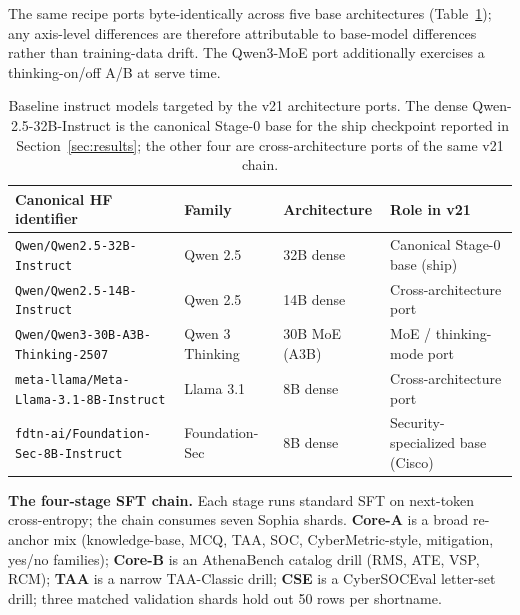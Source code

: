 \documentclass[conference]{IEEEtran}
\providecommand{\hfid}[1]{{\small\nolinkurl{#1}}}
\begin{document}
The same recipe ports byte-identically across five base architectures (Table~\ref{tab:base-models}); any axis-level differences are therefore attributable to base-model differences rather than training-data drift. The Qwen3-MoE port additionally exercises a thinking-on/off A/B at serve time.

\begin{table}[t]
\centering
\caption{Baseline instruct models targeted by the v21 architecture ports. The dense Qwen-2.5-32B-Instruct is the canonical Stage-0 base for the ship checkpoint reported in Section~\ref{sec:results}; the other four are cross-architecture ports of the same v21 chain.}
\label{tab:base-models}
\small
\setlength{\tabcolsep}{4pt}
\begin{tabular}{p{4.8cm} l l l}
\hline
\textbf{Canonical HF identifier} & \textbf{Family} & \textbf{Architecture} & \textbf{Role in v21} \\
\hline
\hfid{Qwen/Qwen2.5-32B-Instruct}             & Qwen 2.5             & 32B dense          & Canonical Stage-0 base (ship) \\
\hfid{Qwen/Qwen2.5-14B-Instruct}             & Qwen 2.5             & 14B dense          & Cross-architecture port \\
\hfid{Qwen/Qwen3-30B-A3B-Thinking-2507}      & Qwen 3 Thinking      & 30B MoE (A3B)      & MoE / thinking-mode port \\
\hfid{meta-llama/Meta-Llama-3.1-8B-Instruct} & Llama 3.1            & 8B dense           & Cross-architecture port \\
\hfid{fdtn-ai/Foundation-Sec-8B-Instruct}    & Foundation-Sec       & 8B dense           & Security-specialized base (Cisco) \\
\hline
\end{tabular}
\end{table}

\textbf{The four-stage SFT chain.} Each stage runs standard SFT on next-token cross-entropy; the chain consumes seven Sophia shards. \textbf{Core-A} is a broad re-anchor mix (knowledge-base, MCQ, TAA, SOC, CyberMetric-style, mitigation, yes/no families); \textbf{Core-B} is an AthenaBench catalog drill (RMS, ATE, VSP, RCM); \textbf{TAA} is a narrow TAA-Classic drill; \textbf{CSE} is a CyberSOCEval letter-set drill; three matched validation shards hold out 50 rows per shortname.
\end{document}
